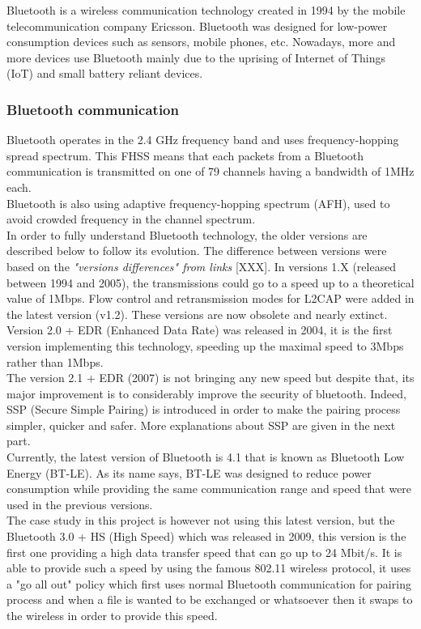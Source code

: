 Bluetooth is a wireless communication technology created in 1994 by the mobile telecommunication company Ericsson. Bluetooth was designed for low-power consumption devices such as sensors, mobile phones, etc. Nowadays, more and more devices use Bluetooth mainly due to the uprising of Internet of Things (IoT) and small battery reliant devices.

\subsubsection{Bluetooth communication}
Bluetooth operates in the 2.4 GHz frequency band and uses frequency-hopping spread spectrum. This FHSS means that each packets from a Bluetooth communication is transmitted on one of 79 channels having a bandwidth of 1MHz each.\\
Bluetooth is also using adaptive frequency-hopping spectrum (AFH), used to avoid crowded frequency in the channel spectrum.\\

In order to fully understand Bluetooth technology, the older versions are described below to follow its evolution. The difference between versions were based on the \textit{"versions differences" from links} [XXX].
In versions 1.X (released between 1994 and 2005), the transmissions could go to a speed up to a theoretical value of 1Mbps. Flow control and retransmission modes for L2CAP were added in the latest version (v1.2). These versions are now obsolete and nearly extinct.\\
Version 2.0 + EDR (Enhanced Data Rate) was released in 2004, it is the first version implementing this technology, speeding up the maximal speed to 3Mbps rather than 1Mbps.\\
The version 2.1 + EDR (2007) is not bringing any new speed but despite that, its major improvement is to considerably improve the security of bluetooth. Indeed, SSP (Secure Simple Pairing) is introduced in order to make the pairing process simpler, quicker and safer. More explanations about SSP are given in the next part.\\
\newpage
Currently, the latest version of Bluetooth is 4.1 that is known as Bluetooth Low Energy (BT-LE). As its name says, BT-LE was designed to reduce power consumption while providing the same communication range and speed that were used in the previous versions. \\
The case study in this project is however not using this latest version, but the Bluetooth 3.0 + HS (High Speed) which was released in 2009, this version is  the first one providing a high data transfer speed that can go up to 24 Mbit/s. It is able to provide such a speed by using the famous 802.11 wireless protocol, it uses a "go all out" policy which first uses normal Bluetooth communication for pairing process and when a file is wanted to be exchanged or whatsoever then it swaps to the wireless in order to provide this speed.\\

